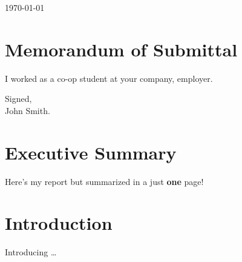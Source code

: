 \documentclass[12pt]{article}
\begin{document}
\begin{titlepage}


	\vfill\vfill\vfill %

	{\large\today} %




	\vfill %

\end{titlepage}

\thispagestyle{empty}

\newpage

\thispagestyle{empty}

\section*{Memorandum of Submittal}
I worked as a co-op student at your company, employer.

Signed, \\
John Smith.

\newpage
\tableofcontents

\setcounter{page}{2}

\newpage

\section*{Executive Summary}
Here's my report but summarized in a just \textbf{one} page!

\newpage

\setcounter{page}{1}

\section{Introduction}
Introducing \dots \lipsum[20]
\end{document}
